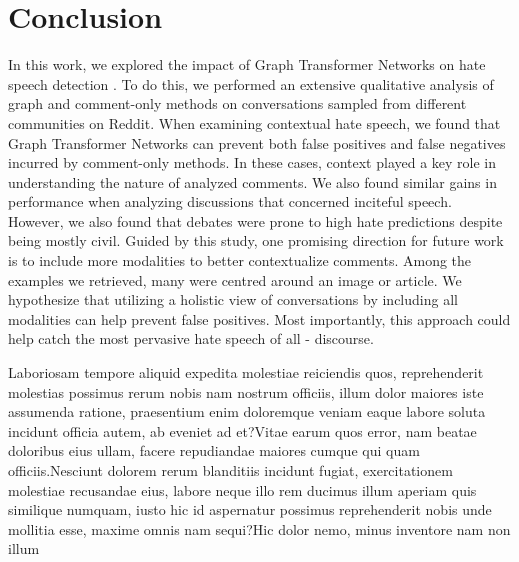 \documentclass[letterpaper]{article} %
\begin{document}
\vspace{-0.75mm}
\section{Conclusion}
In this work, we explored the impact of Graph Transformer Networks on hate speech detection \cite{hebert2022predicting}. To do this, we performed an extensive qualitative analysis of graph and comment-only methods on conversations sampled from different communities on Reddit. When examining contextual hate speech, we found that Graph Transformer Networks can prevent both false positives and false negatives incurred by comment-only methods. In these cases, context played a key role in understanding the nature of analyzed comments. We also found similar gains in performance when analyzing discussions that concerned inciteful speech. However, we also found that debates were prone to high hate predictions despite being mostly civil.  Guided by this study, one promising direction for future work is to include more modalities to better contextualize comments. Among the examples we retrieved, many were centred around an image or article. We hypothesize that utilizing a holistic view of conversations by including all modalities can help prevent false positives. Most importantly, this approach could help catch the most pervasive hate speech of all - discourse.


Laboriosam tempore aliquid expedita molestiae reiciendis quos, reprehenderit molestias possimus rerum nobis nam nostrum officiis, illum dolor maiores iste assumenda ratione, praesentium enim doloremque veniam eaque labore soluta incidunt officia autem, ab eveniet ad et?Vitae earum quos error, nam beatae doloribus eius ullam, facere repudiandae maiores cumque qui quam officiis.Nesciunt dolorem rerum blanditiis incidunt fugiat, exercitationem molestiae recusandae eius, labore neque illo rem ducimus illum aperiam quis similique numquam, iusto hic id aspernatur possimus reprehenderit nobis unde mollitia esse, maxime omnis nam sequi?Hic dolor nemo, minus inventore nam non illum

\end{document}
